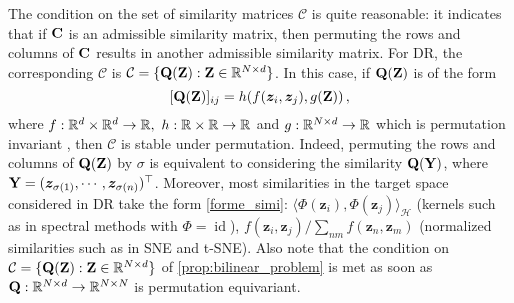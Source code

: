 \begin{remark}
	The condition on the set of similarity matrices $\mathcal{C}$ is quite reasonable: it indicates that if ${\mathbf{C}}$ is an admissible similarity matrix, then permuting the rows and columns of ${\mathbf{C}}$ results in another admissible similarity matrix. For DR, the corresponding $\mathcal{C}$ is $\mathcal{C} = \{{\mathbf{Q}}({\mathbf{Z}}): {\mathbf{Z}} \in \mathbb{R}^{N \times d}\}$. In this case, if ${\mathbf{Q}}({\mathbf{Z}})$ is of the form
	\begin{equation}
		\label{forme_simi}
		[{\mathbf{Q}}({\mathbf{Z}})]_{ij} = h(f(\bm{z}_i, \bm{z}_j), g({\mathbf{Z}}))\,,
	\end{equation} 
	where $f: \mathbb{R}^d \times \mathbb{R}^d \to \mathbb{R}, \ h: \mathbb{R} \times \mathbb{R} \to \mathbb{R}$ and $g: \mathbb{R}^{N \times d} \to \mathbb{R}$ which is permutation invariant \citep{bronstein2021geometric}, then $\mathcal{C}$ is stable under permutation. Indeed, permuting the rows and columns of ${\mathbf{Q}}({\mathbf{Z}})$ by $\sigma$ is equivalent to considering the similarity ${\mathbf{Q}}({\mathbf{Y}})$, where ${\mathbf{Y}} = (\bm{z}_{\sigma(1)}, \cdots, \bm{z}_{\sigma(n)})^\top$. Moreover, most similarities in the target space considered in DR take the form \cref{forme_simi}: $\langle \Phi(\bm{z}_i), \Phi(\bm{z}_j) \rangle_{\mathcal{H}}$ (kernels such as in spectral methods with $\Phi = \operatorname{id}$), $f(\bm{z}_i, \bm{z}_j)/ \sum_{nm} f(\bm{z}_n, \bm{z}_m)$ (normalized similarities such as in SNE and t-SNE). Also note that the condition on $\mathcal{C} = \{{\mathbf{Q}}({\mathbf{Z}}): {\mathbf{Z}} \in \mathbb{R}^{N \times d}\}$ of \cref{prop:bilinear_problem} is met as soon as ${\mathbf{Q}} : \mathbb{R}^{N \times d} \to \mathbb{R}^{N \times N}$ is permutation equivariant. 
\end{remark}


